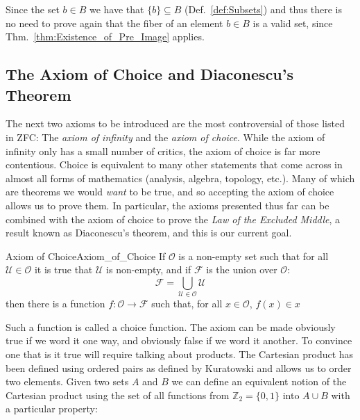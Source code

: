         Since the set $b\in{B}$ we have that $\{b\}\subseteq{B}$
        (Def.~\ref{def:Subsets}) and thus there is no need to prove again that
        the fiber of an element $b\in{B}$ is a valid set, since
        Thm.~\ref{thm:Existence_of_Pre_Image} applies.
    \subsection{The Axiom of Choice and Diaconescu's Theorem}
        The next two axioms to be introduced are the most controversial of those
        listed in ZFC: The \textit{axiom of infinity} and the
        \textit{axiom of choice}. While the axiom of infinity only has a
        small number of critics, the axiom of choice is far more contentious.
        Choice is equivalent to many other statements that come across in
        almost all forms of mathematics (analysis, algebra, topology, etc.).
        Many of which are theorems we would \textit{want} to be true, and so
        accepting the axiom of choice allows us to prove them. In particular,
        the axioms presented thus far can be combined with the axiom of choice
        to prove the \textit{Law of the Excluded Middle}, a result known as
        Diaconescu's theorem, and this is our current goal.
        \begin{faxiom}{Axiom of Choice}{Axiom_of_Choice}
            If $\mathcal{O}$ is a non-empty set such that for all
            $\mathcal{U}\in\mathcal{O}$ it is true that $\mathcal{U}$ is
            non-empty, and if $\mathcal{F}$ is the union over $\mathcal{O}$:
            \begin{equation}
                \mathcal{F}=\bigcup_{\mathcal{U}\in\mathcal{O}}\mathcal{U}
            \end{equation}
            then there is a function $f:\mathcal{O}\rightarrow\mathcal{F}$ such
            that, for all $x\in\mathcal{O}$, $f(x)\in{x}$
        \end{faxiom}
        Such a function is called a choice function. The axiom can be made
        obviously true if we word it one way, and obviously false if we word it
        another. To convince one that is it true will require talking about
        products. The Cartesian product has been defined using ordered pairs
        as defined by Kuratowski and allows us to order two elements. Given two
        sets $A$ and $B$ we can define an equivalent notion of the Cartesian
        product using the set of all functions from $\mathbb{Z}_{2}=\{0,1\}$
        into $A\cup{B}$ with a particular property:
